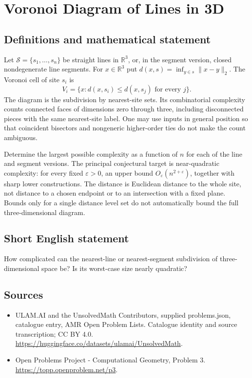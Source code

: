 \documentclass[11pt,a4paper]{article}
\begin{document}
\section*{Voronoi Diagram of Lines in 3D}\label{statement}

\subsection{Definitions and mathematical statement}
Let $\mathcal S=\{s_1,\ldots,s_n\}$ be straight lines in $\mathbb R^3$,
or, in the segment version, closed nondegenerate line segments. For
$x\in\mathbb R^3$ put $d(x,s)=\inf_{y\in s}\|x-y\|_2$. The Voronoi cell
of site $s_i$ is
\[
 V_i=\{x:d(x,s_i)\le d(x,s_j)\text{ for every }j\}.
\]
The diagram is the subdivision by nearest-site sets. Its combinatorial
complexity counts connected faces of dimensions zero through three,
including disconnected pieces with the same nearest-site label. One
may use inputs in general position so that coincident bisectors and
nongeneric higher-order ties do not make the count ambiguous.

Determine the largest possible complexity as a function of $n$ for each
of the line and segment versions. The principal conjectural target is
near-quadratic complexity: for every fixed $\varepsilon>0$, an upper bound
$O_\varepsilon(n^{2+\varepsilon})$, together with sharp lower constructions.
The distance is Euclidean distance to the whole site, not distance to a
chosen endpoint or to an intersection with a fixed plane. Bounds only
for a single distance level set do not automatically bound the full
three-dimensional diagram.
\subsection{Short English statement}
How complicated can the nearest-line or nearest-segment subdivision of
three-dimensional space be? Is its worst-case size nearly quadratic?
\subsection{Sources}
\begin{itemize}
\item[S1] ULAM.AI and the UnsolvedMath Contributors, supplied problems.json, catalogue entry, AMR Open Problem Lists. Catalogue identity and source transcription; CC BY 4.0.
\url{https://huggingface.co/datasets/ulamai/UnsolvedMath}.
\item[S2] Open Problems Project - Computational Geometry, Problem 3. 
\url{https://topp.openproblem.net/p3}.
\end{itemize}
\end{document}
